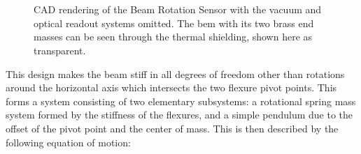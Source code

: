 \documentclass [12pt, proquest]{uwthesis}[2019]
\begin{document}
\begin{figure}
\begin{center}
\\
\caption{CAD rendering of the Beam Rotation Sensor with the vacuum and optical readout systems omitted. The bem with its two brass end masses can be seen through the thermal shielding, shown here as transparent. }
\\
\label{BRS}

\end{center}
\end{figure}

This design makes the beam stiff in all degrees of freedom other than rotations around the horizontal axis which intersects the two flexure pivot points. This forms a system consisting of two elementary subsystems: a rotational spring mass system formed by the stiffness of the flexures, and a simple pendulum due to the offset of the pivot point and the center of mass. This is then described by the following equation of motion: \cite{venk2014}
\end{document}
